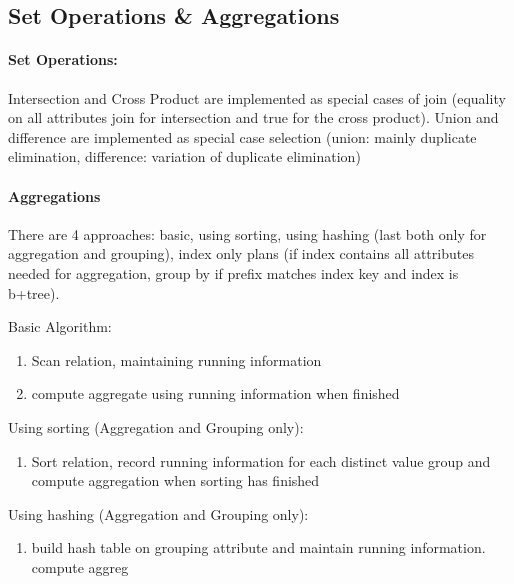     
 \subsection{Set Operations \& Aggregations}
 \paragraph{Set Operations:} Intersection and Cross Product are implemented as special cases of join (equality on all attributes join for intersection and true for the cross product). Union and difference are implemented as special case selection (union: mainly duplicate elimination, difference: variation of duplicate elimination)
 
 \paragraph{Aggregations} There are 4 approaches: basic, using sorting, using hashing (last both only for aggregation and grouping), index only plans (if index contains all attributes needed for aggregation, group by if prefix matches index key and index is b+tree).
 
 Basic Algorithm: 
 \begin{enumerate}
     \item Scan relation, maintaining running information
     \item compute aggregate using running information when finished
 \end{enumerate}
 
 Using sorting (Aggregation and Grouping only): 
 \begin{enumerate}
     \item Sort relation, record running information for each distinct value group and compute aggregation when sorting has finished
 \end{enumerate}
 
 Using hashing (Aggregation and Grouping only):
 \begin{enumerate}
     \item build hash table on grouping attribute and maintain running information. compute aggreg
 \end{enumerate}
 
